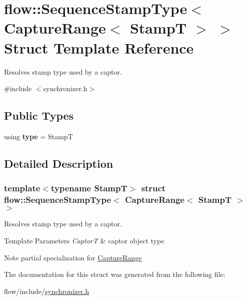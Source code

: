 \hypertarget{structflow_1_1_sequence_stamp_type_3_01_capture_range_3_01_stamp_t_01_4_01_4}{}\section{flow\+:\+:Sequence\+Stamp\+Type$<$ Capture\+Range$<$ StampT $>$ $>$ Struct Template Reference}
\label{structflow_1_1_sequence_stamp_type_3_01_capture_range_3_01_stamp_t_01_4_01_4}


Resolves stamp type used by a captor.  




{\ttfamily \#include $<$synchronizer.\+h$>$}

\subsection*{Public Types}
\begin{DoxyCompactItemize}
\item 
\mbox{\label{structflow_1_1_sequence_stamp_type_3_01_capture_range_3_01_stamp_t_01_4_01_4_a2d2f41035ff54aa883f6de0fe7b36a8a}} 
using {\bfseries type} = StampT
\end{DoxyCompactItemize}


\subsection{Detailed Description}
\subsubsection*{template$<$typename StampT$>$\newline
struct flow\+::\+Sequence\+Stamp\+Type$<$ Capture\+Range$<$ Stamp\+T $>$ $>$}

Resolves stamp type used by a captor. 


\begin{DoxyTemplParams}{Template Parameters}
{\em CaptorT} & captor object type\\
\hline
\end{DoxyTemplParams}
\begin{DoxyNote}{Note}
partial specialization for \hyperlink{structflow_1_1_capture_range}{Capture\+Range} 
\end{DoxyNote}


The documentation for this struct was generated from the following file\+:\begin{DoxyCompactItemize}
\item 
flow/include/\hyperlink{synchronizer_8h}{synchronizer.\+h}\end{DoxyCompactItemize}
